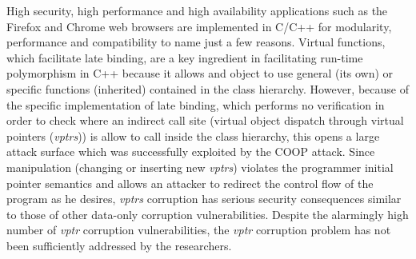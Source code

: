 
% 



High security, high performance and high availability 
applications such as the Firefox and Chrome web browsers 
are implemented in C/C++ for modularity, performance and 
compatibility to name just a few reasons.
Virtual functions, which facilitate late binding,
are a key ingredient in facilitating run-time polymorphism
in C++ because it allows and object to use general (its own) 
or specific functions (inherited) contained in the class hierarchy.
However, because of the specific implementation of late binding,
which performs no verification in order to check where an indirect call site 
(virtual object dispatch through virtual pointers (\textit{vptrs})) is allow to
call inside the class hierarchy, this opens a large attack surface which
was successfully exploited by the COOP attack.
Since manipulation (changing or inserting new \textit{vptrs}) violates the 
programmer initial pointer semantics and allows an attacker to
redirect the control flow of the program as he desires, \textit{vptrs} corruption
has serious security consequences similar to those of other 
data-only corruption vulnerabilities.
Despite the alarmingly high number of \textit{vptr} corruption
vulnerabilities, the \textit{vptr} corruption problem has not
been sufficiently addressed by the researchers.

